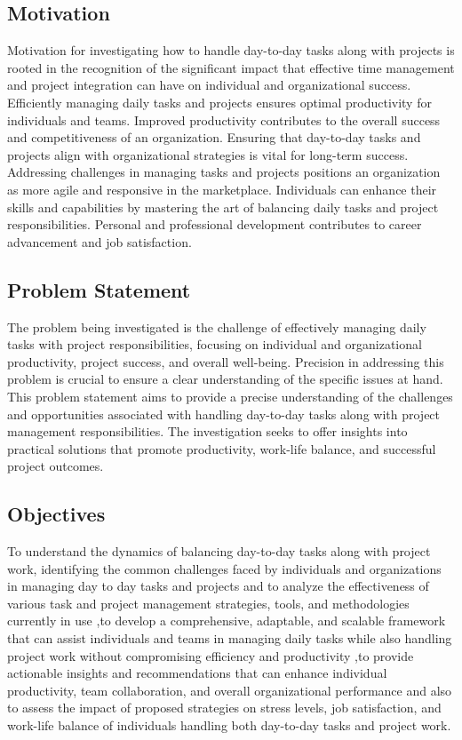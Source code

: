 \documentclass{chart}
\begin{document}
\subsection{Motivation} 
Motivation for investigating how to handle day-to-day tasks along with projects is rooted in the recognition of the significant impact that effective time management and project integration can have on individual and organizational success. Efficiently managing daily tasks and projects ensures optimal productivity for individuals and teams. Improved productivity contributes to the overall success and competitiveness of an organization. Ensuring that day-to-day tasks and projects align with organizational strategies is vital for long-term success. Addressing challenges in managing tasks and projects positions an organization as more agile and responsive in the marketplace. Individuals can enhance their skills and capabilities by mastering the art of balancing daily tasks and project responsibilities. Personal and professional development contributes to career advancement and job satisfaction.

\subsection{Problem Statement} 
The problem being investigated is the challenge of effectively managing daily tasks with project responsibilities, focusing on individual and organizational productivity, project success, and overall well-being. Precision in addressing this problem is crucial to ensure a clear understanding of the specific issues at hand. This problem statement aims to provide a precise understanding of the challenges and opportunities associated with handling day-to-day tasks along with project management responsibilities. The investigation seeks to offer insights into practical solutions that promote productivity, work-life balance, and successful project outcomes.

\subsection{Objectives} 
To understand the dynamics of balancing day-to-day tasks along with project work, identifying the common challenges faced by individuals and organizations in managing day to day tasks and projects and to analyze the effectiveness of various task and project management strategies, tools, and methodologies currently in use ,to develop a comprehensive, adaptable, and scalable framework that can assist individuals and teams in managing daily tasks while also handling project work without compromising efficiency and productivity ,to provide actionable insights and recommendations that can enhance individual productivity, team collaboration, and overall organizational performance and also to assess the impact of proposed strategies on stress levels, job satisfaction, and work-life balance of individuals handling both day-to-day tasks and project work.
\end{document}

